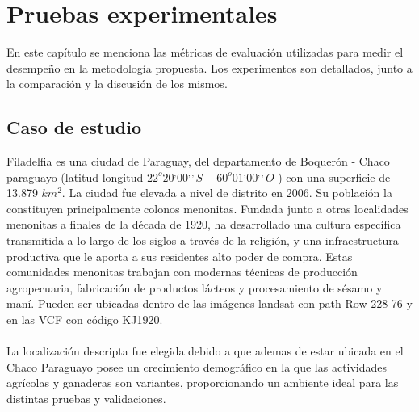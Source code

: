 \newpage{\ } 
\thispagestyle{empty} 

\chapter{Pruebas experimentales}
En este cap\'itulo se menciona las m\'etricas de evaluaci\'on utilizadas para medir el desempe\~{n}o en la metodolog\'ia propuesta. Los experimentos son detallados, junto a la comparaci\'on y la discusi\'on de los mismos.

\section{Caso de estudio}
Filadelfia es una ciudad de Paraguay, del departamento de Boquer\'on - Chaco paraguayo (latitud-longitud $22^{o}20^{,}00^{,,} S - 60^{o}01^{,} 00^{,,} O$ ) con una superficie de 13.879 $ km^{2} $. La ciudad fue elevada a nivel de distrito en 2006. Su poblaci\'on la constituyen principalmente colonos menonitas. Fundada junto a otras localidades menonitas a finales de la d\'ecada de 1920, ha desarrollado una cultura espec\'ifica transmitida a lo largo de los siglos a trav\'es de la religi\'on, y una infraestructura productiva que le aporta a sus residentes alto poder de compra. Estas comunidades menonitas trabajan con modernas t\'ecnicas de producci\'on agropecuaria, fabricaci\'on de productos l\'acteos y procesamiento de s\'esamo y man\'i. Pueden ser ubicadas dentro de las im\'agenes landsat con path-Row 228-76 y en las VCF con c\'odigo KJ1920.\\~\\
La localizaci\'on descripta fue elegida debido a que ademas de estar ubicada en el Chaco Paraguayo posee un crecimiento demogr\'afico en la que las actividades agr\'icolas y ganaderas son variantes, proporcionando un ambiente ideal para las distintas pruebas y validaciones.

